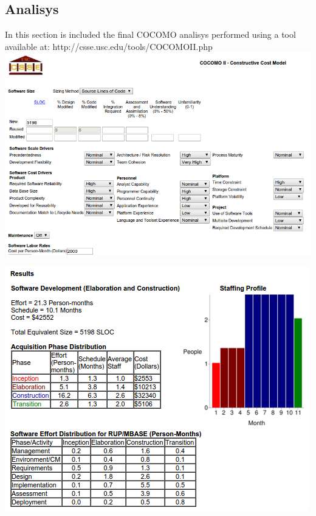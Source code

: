 \documentclass[11pt,titlepage]{article} %
\begin{document}
  \subsection{Analisys}
    In this section is included the final COCOMO analisys performed using a tool available at:\newline
    http://csse.usc.edu/tools/COCOMOII.php\newline
    \includegraphics[scale=0.5]{cocomo1.png}
    \newpage
    \begin{center}
      \includegraphics[scale=0.6]{cocomo2.png}
    \end{center}

\newpage
\end{document}
